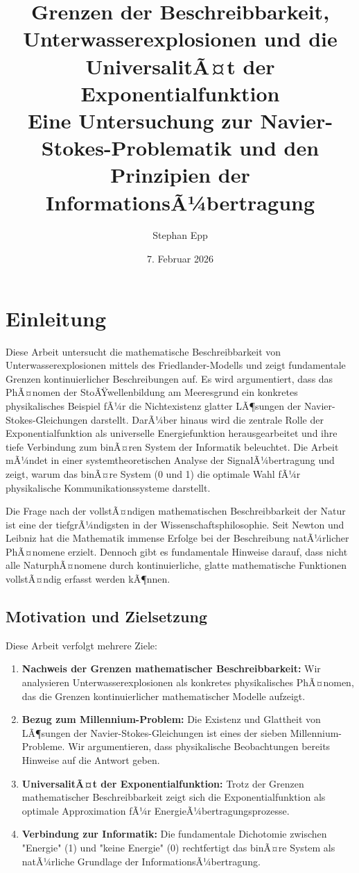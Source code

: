 ﻿\documentclass[12pt,a4paper]{article}
\title{\textbf{Grenzen der Beschreibbarkeit, Unterwasserexplosionen und die UniversalitÃ¤t der Exponentialfunktion}\\
Eine Untersuchung zur Navier-Stokes-Problematik und den Prinzipien der InformationsÃ¼bertragung}
\author{Stephan Epp}
\date{7. Februar 2026}
\theoremstyle{definition}
\theoremstyle{remark}
\begin{document}
\maketitle
\tableofcontents
\newpage

\section{Einleitung}
Diese Arbeit untersucht die mathematische Beschreibbarkeit von Unterwasserexplosionen mittels des Friedlander-Modells und zeigt fundamentale Grenzen kontinuierlicher Beschreibungen auf. Es wird argumentiert, dass das PhÃ¤nomen der StoÃŸwellenbildung am Meeresgrund ein konkretes physikalisches Beispiel fÃ¼r die Nichtexistenz glatter LÃ¶sungen der Navier-Stokes-Gleichungen darstellt. DarÃ¼ber hinaus wird die zentrale Rolle der Exponentialfunktion als universelle Energiefunktion herausgearbeitet und ihre tiefe Verbindung zum binÃ¤ren System der Informatik beleuchtet. Die Arbeit mÃ¼ndet in einer systemtheoretischen Analyse der SignalÃ¼bertragung und zeigt, warum das binÃ¤re System (0 und 1) die optimale Wahl fÃ¼r physikalische Kommunikationssysteme darstellt.

Die Frage nach der vollstÃ¤ndigen mathematischen Beschreibbarkeit der Natur ist eine der tiefgrÃ¼ndigsten in der Wissenschaftsphilosophie. Seit Newton und Leibniz hat die Mathematik immense Erfolge bei der Beschreibung natÃ¼rlicher PhÃ¤nomene erzielt. Dennoch gibt es fundamentale Hinweise darauf, dass nicht alle NaturphÃ¤nomene durch kontinuierliche, glatte mathematische Funktionen vollstÃ¤ndig erfasst werden kÃ¶nnen.

\subsection{Motivation und Zielsetzung}

Diese Arbeit verfolgt mehrere Ziele:

\begin{enumerate}
\item \textbf{Nachweis der Grenzen mathematischer Beschreibbarkeit:} Wir analysieren Unterwasserexplosionen als konkretes physikalisches PhÃ¤nomen, das die Grenzen kontinuierlicher mathematischer Modelle aufzeigt.

\item \textbf{Bezug zum Millennium-Problem:} Die Existenz und Glattheit von LÃ¶sungen der Navier-Stokes-Gleichungen ist eines der sieben Millennium-Probleme. Wir argumentieren, dass physikalische Beobachtungen bereits Hinweise auf die Antwort geben.

\item \textbf{UniversalitÃ¤t der Exponentialfunktion:} Trotz der Grenzen mathematischer Beschreibbarkeit zeigt sich die Exponentialfunktion als optimale Approximation fÃ¼r EnergieÃ¼bertragungsprozesse.

\item \textbf{Verbindung zur Informatik:} Die fundamentale Dichotomie zwischen "Energie" (1) und "keine Energie" (0) rechtfertigt das binÃ¤re System als natÃ¼rliche Grundlage der InformationsÃ¼bertragung.
\end{enumerate}
\end{document}
